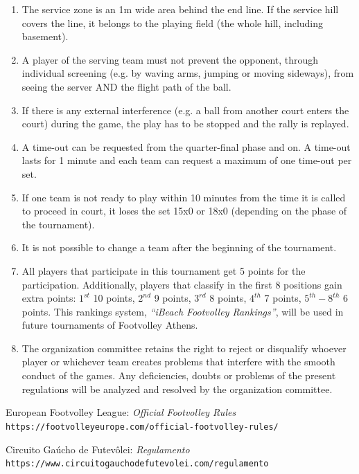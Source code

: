 \documentclass[a4paper,11pt]{article}
\begin{document}
\begin{enumerate}
\item The service zone is an 1m wide area behind the end line. If the service
  hill covers the line, it belongs to the playing field (the whole hill,
  including basement).

\item A player of the serving team must not prevent the opponent, through
  individual screening (e.g. by waving arms, jumping or moving sideways), from
  seeing the server AND the flight path of the ball.

\item If there is any external interference (e.g. a ball from another court
  enters the court) during the game, the play has to be stopped and the rally is
  replayed.

\item A time-out can be requested from the quarter-final phase and on. A
  time-out lasts for 1 minute and each team can request a maximum of one
  time-out per set.

\item If one team is not ready to play within 10 minutes from the time it is
  called to proceed in court, it loses the set 15x0 or 18x0 (depending on the
  phase of the tournament).

\item It is not possible to change a team after the beginning of the tournament.

\item All players that participate in this tournament get 5 points for the
  participation. Additionally, players that classify in the first 8 positions
  gain extra points: $1^{st}$ 10 points, $2^{nd}$ 9 points, $3^{rd}$ 8 points,
  $4^{th}$ 7 points, $5^{th}-8^{th}$ 6 points. This rankings system,
  \textit{``iBeach Footvolley Rankings''}, will be used in future tournaments of
  Footvolley Athens.

\item The organization committee retains the right to reject or disqualify
  whoever player or whichever team creates problems that interfere with the
  smooth conduct of the games. Any deficiencies, doubts or problems of the
  present regulations will be analyzed and resolved by the organization
  committee.

\end{enumerate}

\renewcommand{\refname}{}

\begin{thebibliography}{1}

  European Footvolley League:
  \textit{Official Footvolley Rules}
  \\\texttt{https://footvolleyeurope.com/official-footvolley-rules/}

  Circuito Gaúcho de Futevôlei:
  \textit{Regulamento}
  \\\texttt{https://www.circuitogauchodefutevolei.com/regulamento}
\end{thebibliography}
\end{document}

